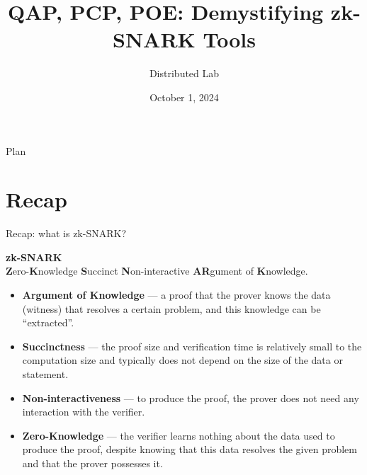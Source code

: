 \documentclass{zkdl-presentation-template}
\title[zk-SNARK: Part II]{\textbf{QAP, PCP, POE: Demystifying zk-SNARK Tools}}
\author{Distributed Lab}
\date{October 1, 2024}
\begin{document}

    \begin{frame}{Plan}
        \tableofcontents
    \end{frame}

    \section{Recap}

    \begin{frame}{Recap: what is zk-SNARK?}
        \begin{definition}
            \begin{center}
                \textbf{zk-SNARK} \\
                \textbf{Z}ero-\textbf{K}nowledge \textbf{S}uccinct \textbf{N}on-interactive \textbf{AR}gument of \textbf{K}nowledge.
            \end{center}
        \end{definition}

        \pause

        \begin{itemize}[label=]
            \item \textbf{Argument of Knowledge} --- a proof that the prover knows the data (witness) that resolves a certain
            problem, and this knowledge can be ``extracted''. \pause
            \item \textbf{Succinctness} --- the proof size and verification time is relatively small to the computation size and typically does not depend on the size of 
            the data or statement. \pause
            \item \textbf{Non-interactiveness} --- to produce the proof, the prover does not need any interaction
            with the verifier. \pause
            \item \textbf{Zero-Knowledge} --- the verifier learns nothing about the data used to produce the
            proof, despite knowing that this data resolves the given problem and that the prover possesses it.
        \end{itemize}
    \end{frame}
\end{document}
